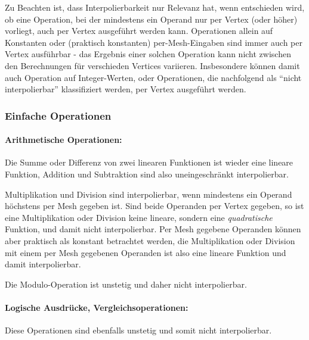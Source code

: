 \documentclass[twoside,a4paper,fleqn,12pt]{book}
\begin{document}
Zu Beachten ist, dass Interpolierbarkeit nur Relevanz hat, wenn entschieden wird, ob eine Operation, bei der mindestens ein Operand
nur per Vertex (oder höher) vorliegt, auch per Vertex ausgeführt werden kann.
Operationen allein auf Konstanten oder (praktisch konstanten) per-Mesh-Eingaben sind immer auch per Vertex ausführbar - das Ergebnis
einer solchen Operation kann nicht zwischen den Berechnungen für verschieden Vertices variieren. Insbesondere können damit
auch Operation auf Integer-Werten, oder Operationen, die nachfolgend als "`nicht interpolierbar"' klassifiziert werden,
per Vertex ausgeführt werden.



\subsubsection{Einfache Operationen}

\paragraph{Arithmetische Operationen:} Die Summe oder Differenz von zwei linearen Funktionen
ist wieder eine lineare Funktion, Addition und Subtraktion sind also uneingeschränkt interpolierbar.

Multiplikation und Division sind interpolierbar, wenn mindestens ein Operand höchstens per Mesh gegeben ist.
Sind beide Operanden per Vertex gegeben, so ist eine Multiplikation oder Division keine lineare,
sondern eine \emph{quadratische} Funktion, und damit nicht interpolierbar. Per Mesh gegebene Operanden können aber praktisch als
konstant betrachtet werden, die Multiplikation oder Division mit einem per Mesh gegebenen
Operanden ist also eine lineare Funktion und damit interpolierbar.

Die Modulo-Operation ist unstetig und daher nicht interpolierbar.

\paragraph{Logische Ausdrücke, Vergleichsoperationen:} Diese Operationen sind ebenfalls unstetig und somit nicht interpolierbar.
\end{document}
